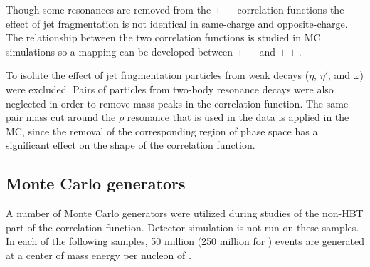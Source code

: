 Though some resonances are removed from the $+-$ correlation functions the effect of jet fragmentation is not identical in same-charge and opposite-charge.
The relationship between the two correlation functions is studied in \ac{MC} simulations so a mapping can be developed between $+-$ and $\pm\pm$.

To isolate the effect of jet fragmentation particles from weak decays ($\eta$, $\eta'$, and $\omega$) were excluded.
Pairs of particles from two-body resonance decays were also neglected in order to remove mass peaks in the correlation function.
The same pair mass cut around the $\rho$ resonance that is used in the data is applied in the \ac{MC}, since the removal of the corresponding region of phase space has a significant effect on the shape of the correlation function.

\subsection{Monte Carlo generators}
\label{subsec:generators}

A number of Monte Carlo generators were utilized during studies of the non-HBT part of the correlation function.
Detector simulation is not run on these samples.
In each of the following samples, 50 million (250 million for \PYEight) \minbias events are generated at a center of mass energy per nucleon of \pPbenergy.

